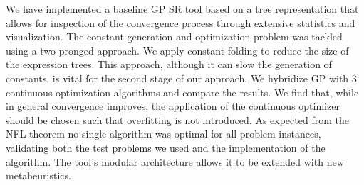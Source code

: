We have implemented a baseline GP SR tool based on a tree representation that allows for inspection of the convergence process through extensive statistics and visualization. The constant generation and optimization problem was tackled using a two-pronged approach. We apply constant folding to reduce the size of the expression trees. This approach, although it can slow the generation of constants, is vital for the second stage of our approach. We hybridize GP with 3 continuous optimization algorithms and compare the results. We find that, while in general convergence improves, the application of the continuous optimizer should be chosen such that overfitting is not introduced. As expected from the NFL theorem no single algorithm was optimal for all problem instances, validating both the test problems we used and the implementation of the algorithm. The tool's modular architecture allows it to be extended with new metaheuristics. 
